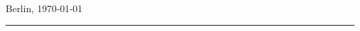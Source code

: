 \begin{titlepage}
    \vfill

    {\large Berlin, \today}

    \vspace{0.3cm}

    \noindent
    {\color{UERed}\rule{\textwidth}{3pt}}

\end{titlepage}
